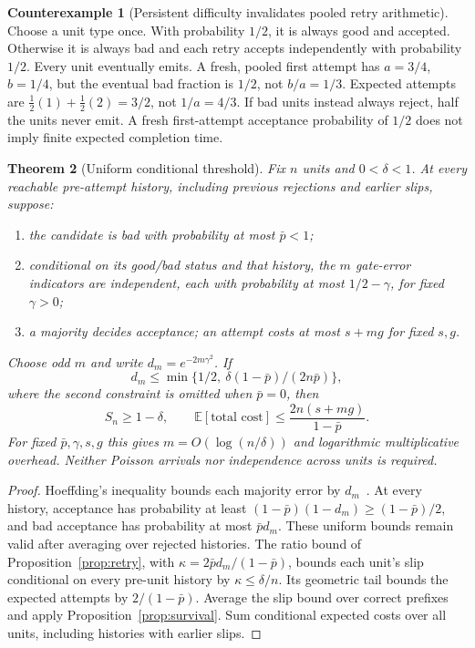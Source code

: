 \documentclass[11pt]{article}
\newtheorem{theorem}{Theorem}
\theoremstyle{definition}
\newtheorem{example}[theorem]{Counterexample}
\theoremstyle{remark}
\newcommand{\E}{\mathbb E}
\begin{document}
\begin{example}[Persistent difficulty invalidates pooled retry arithmetic]\label{ex:retry}
Choose a unit type once. With probability $1/2$, it is always good and accepted.
Otherwise it is always bad and each retry accepts independently with probability $1/2$.
Every unit eventually emits. A fresh, pooled first attempt has $a=3/4$, $b=1/4$, but
the eventual bad fraction is $1/2$, not $b/a=1/3$.
Expected attempts are $\tfrac12(1)+\tfrac12(2)=3/2$, not $1/a=4/3$.
If bad units instead always reject, half the units never emit. A fresh first-attempt
acceptance probability of $1/2$ does not imply finite expected completion time.
\end{example}

\begin{theorem}[Uniform conditional threshold]\label{thm:threshold}
Fix $n$ units and $0<\delta<1$. At every reachable pre-attempt history, including previous
rejections and earlier slips, suppose:
\begin{enumerate}[label=(\roman*),itemsep=1pt]
\item the candidate is bad with probability at most $\bar p<1$;
\item conditional on its good/bad status and that history, the $m$ gate-error indicators
are independent, each with probability at most $1/2-\gamma$, for fixed $\gamma>0$;
\item a majority decides acceptance; an attempt costs at most $s+mg$ for fixed $s,g$.
\end{enumerate}
Choose odd $m$ and write $d_m=e^{-2m\gamma^2}$. If
\[
d_m\le\min\{1/2,\ \delta(1-\bar p)/(2n\bar p)\},
\]
where the second constraint is omitted when $\bar p=0$, then
\[
S_n\ge1-\delta,\qquad
\E[\text{total cost}]\le\frac{2n(s+mg)}{1-\bar p}.
\]
For fixed $\bar p,\gamma,s,g$ this gives $m=O(\log(n/\delta))$ and logarithmic
multiplicative overhead. Neither Poisson arrivals nor independence across units is required.
\end{theorem}
\begin{proof}
Hoeffding's inequality bounds each majority error by $d_m$~\cite{hoeffding}.
At every history, acceptance has probability at least
$(1-\bar p)(1-d_m)\ge(1-\bar p)/2$, and bad acceptance has probability at most $\bar p d_m$.
These uniform bounds remain valid after averaging over rejected histories.
The ratio bound of Proposition~\ref{prop:retry}, with $\kappa=2\bar p d_m/(1-\bar p)$, bounds
each unit's slip conditional on every pre-unit history by $\kappa\le\delta/n$. Its geometric
tail bounds the expected attempts by $2/(1-\bar p)$.
Average the slip bound over correct prefixes and apply Proposition~\ref{prop:survival}.
Sum conditional expected costs over all units, including histories with earlier slips.
\end{proof}
\end{document}

